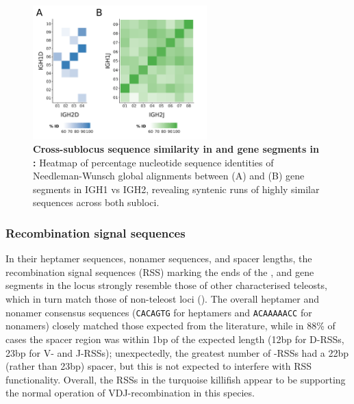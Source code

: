 
\begin{figure}
\centering
	\centering
	\begin{subfigure}{0em}
    \label{fig:nfu-dj-alignment-a}
    \end{subfigure}
    \begin{subfigure}{0em}
    \label{fig:nfu-dj-alignment-b}
    \end{subfigure}

\includegraphics[width=0.6\textwidth]{_Figures/png/nfu-dj-aln}
\caption[Cross-sublocus sequence similarity in \dh and \jh gene segments in \Nfu]{\textbf{Cross-sublocus sequence similarity in \dh and \jh gene segments in \Nfu:} Heatmap of percentage nucleotide sequence identities of Needleman-Wunsch global alignments between (A) \dh and (B) \jh gene segments in IGH1 vs IGH2, revealing syntenic runs of highly similar sequences across both subloci.}
\label{fig:nfu-dj-alignment}
\end{figure}

	\subsubsection{Recombination signal sequences}
	
	In their heptamer sequences, nonamer sequences, and spacer lengths, the recombination signal sequences (RSS) marking the ends of the \vh, \dh and \jh gene segments in the \Nfu locus strongly resemble those of other characterised teleosts, which in turn match those of non-teleost loci (). The overall heptamer and nonamer consensus sequences (\texttt{CACAGTG} for heptamers and \texttt{ACAAAAACC} for nonamers) closely matched those expected from the literature, while in 88\% of cases the spacer region was within 1bp of the expected length (12bp for D-RSSs, 23bp for V- and J-RSSs); unexpectedly, the greatest number of \vh-RSSs had a 22bp (rather than 23bp) spacer, but this is not expected to interfere with RSS functionality. Overall, the RSSs in the turquoise killifish appear to be supporting the normal operation of VDJ-recombination in this species.
	
